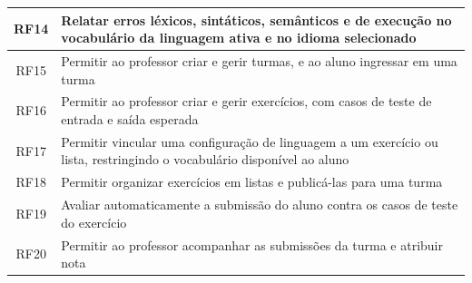 \begin{table}[htbp]
\begin{tabular}{|c|>{\raggedright\arraybackslash}p{12.3cm}|}
        \hline
        RF14 & Relatar erros léxicos, sintáticos, semânticos e de execução no vocabulário da linguagem ativa e no idioma selecionado \\
        \hline
        RF15 & Permitir ao professor criar e gerir turmas, e ao aluno ingressar em uma turma \\
        \hline
        RF16 & Permitir ao professor criar e gerir exercícios, com casos de teste de entrada e saída esperada \\
        \hline
        RF17 & Permitir vincular uma configuração de linguagem a um exercício ou lista, restringindo o vocabulário disponível ao aluno \\
        \hline
        RF18 & Permitir organizar exercícios em listas e publicá-las para uma turma \\
        \hline
        RF19 & Avaliar automaticamente a submissão do aluno contra os casos de teste do exercício \\
        \hline
        RF20 & Permitir ao professor acompanhar as submissões da turma e atribuir nota \\
        \hline
    \end{tabular}
\end{table}

